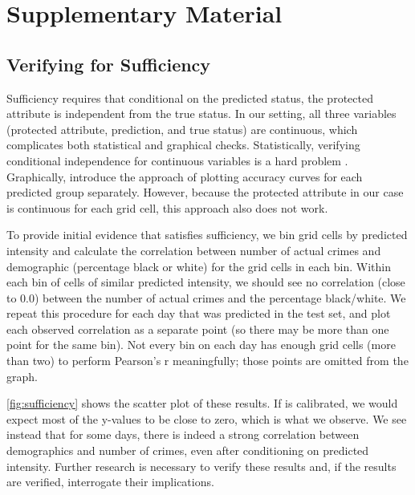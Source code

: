 \chapter{Supplementary Material} \label{app:math}

\section{Verifying \pp for Sufficiency} \label{sec:sufficiency}

Sufficiency requires that conditional on the predicted status, the protected attribute is independent from the true status. In our setting, all three variables (protected attribute, prediction, and true status) are continuous, which complicates both statistical and graphical checks. Statistically, verifying conditional independence for continuous variables is a hard problem \citep{bergsma_testing_2004}. Graphically, \citet{barocas_fairness_2018} introduce the approach of plotting accuracy curves for each predicted group separately. However, because the protected attribute in our case is continuous for each grid cell, this approach also does not work.

To provide initial evidence that \pp satisfies sufficiency, we bin grid cells by predicted intensity and calculate the correlation between number of actual crimes and demographic (percentage black or white) for the grid cells in each bin. Within each bin of cells of similar predicted intensity, we should see no correlation (close to 0.0) between the number of actual crimes and the percentage black/white. We repeat this procedure for each day that was predicted in the test set, and plot each observed correlation as a separate point (so there may be more than one point for the same bin). Not every bin on each day has enough grid cells (more than two) to perform Pearson's r meaningfully; those points are omitted from the graph.

\autoref{fig:sufficiency} shows the scatter plot of these results. If \pp is calibrated, we would expect most of the y-values to be close to zero, which is what we observe. We see instead that for some days, there is indeed a strong correlation between demographics and number of crimes, even after conditioning on predicted intensity. Further research is necessary to verify these results and, if the results are verified, interrogate their implications.

